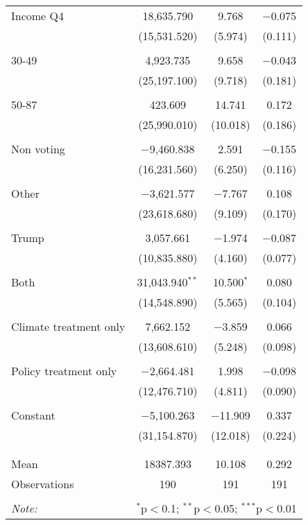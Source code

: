 \begin{tabular}{@{\extracolsep{5pt}}lccc}
 Income Q4 & 18,635.790 & 9.768 & $-$0.075 \\ 
  & (15,531.520) & (5.974) & (0.111) \\ 
  & & & \\ 
 30-49 & 4,923.735 & 9.658 & $-$0.043 \\ 
  & (25,197.100) & (9.718) & (0.181) \\ 
  & & & \\ 
 50-87 & 423.609 & 14.741 & 0.172 \\ 
  & (25,990.010) & (10.018) & (0.186) \\ 
  & & & \\ 
 Non voting & $-$9,460.838 & 2.591 & $-$0.155 \\ 
  & (16,231.560) & (6.250) & (0.116) \\ 
  & & & \\ 
 Other & $-$3,621.577 & $-$7.767 & 0.108 \\ 
  & (23,618.680) & (9.109) & (0.170) \\ 
  & & & \\ 
 Trump & 3,057.661 & $-$1.974 & $-$0.087 \\ 
  & (10,835.880) & (4.160) & (0.077) \\ 
  & & & \\ 
 Both & 31,043.940$^{**}$ & 10.500$^{*}$ & 0.080 \\ 
  & (14,548.890) & (5.565) & (0.104) \\ 
  & & & \\ 
 Climate treatment only & 7,662.152 & $-$3.859 & 0.066 \\ 
  & (13,608.610) & (5.248) & (0.098) \\ 
  & & & \\ 
 Policy treatment only & $-$2,664.481 & 1.998 & $-$0.098 \\ 
  & (12,476.710) & (4.811) & (0.090) \\ 
  & & & \\ 
 Constant & $-$5,100.263 & $-$11.909 & 0.337 \\ 
  & (31,154.870) & (12.018) & (0.224) \\ 
  & & & \\ 
\hline \\[-1.8ex] 
Mean & 18387.393 & 10.108 & 0.292 \\ 
Observations & 190 & 191 & 191 \\ 
\hline 
\hline \\[-1.8ex] 
\textit{Note:}  & \multicolumn{3}{r}{$^{*}$p$<$0.1; $^{**}$p$<$0.05; $^{***}$p$<$0.01} \\ 
\end{tabular} 
